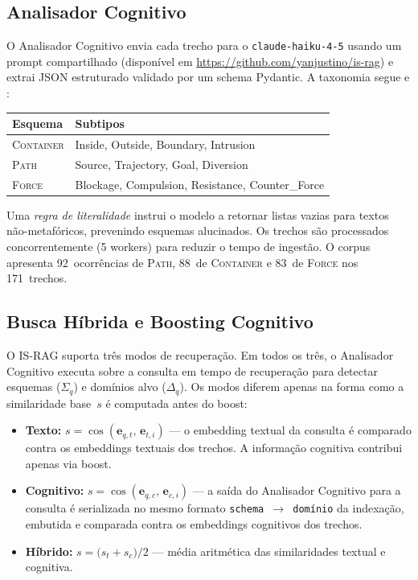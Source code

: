 \documentclass[11pt,a4paper]{article}
\begin{document}
\subsection{Analisador Cognitivo}

O Analisador Cognitivo envia cada trecho para o
\texttt{claude-haiku-4-5} \citep{anthropic2024} usando um prompt
compartilhado (disponível em \url{https://github.com/yanjustino/is-rag}) e extrai JSON estruturado
validado por um schema Pydantic.
A taxonomia segue \citet{lakoff1980} e \citet{talmy1988}:

\begin{center}
\small
\begin{tabular}{ll}
\toprule
\textbf{Esquema} & \textbf{Subtipos} \\
\midrule
\textsc{Container} & Inside, Outside, Boundary, Intrusion \\
\textsc{Path}      & Source, Trajectory, Goal, Diversion \\
\textsc{Force}     & Blockage, Compulsion, Resistance, Counter\_Force \\
\bottomrule
\end{tabular}
\end{center}

Uma \emph{regra de literalidade} instrui o modelo a retornar listas
vazias para textos não-metafóricos, prevenindo esquemas alucinados.
Os trechos são processados concorrentemente (5 workers) para reduzir
o tempo de ingestão.
O corpus apresenta 92~ocorrências de \textsc{Path}, 88~de
\textsc{Container} e 83~de \textsc{Force} nos 171~trechos.

\subsection{Busca Híbrida e Boosting Cognitivo}
\label{sec:boosting}

O IS-RAG suporta três modos de recuperação.
Em todos os três, o Analisador Cognitivo executa sobre a consulta em
tempo de recuperação para detectar esquemas ($\Sigma_q$) e domínios
alvo ($\Delta_q$).
Os modos diferem apenas na forma como a similaridade base~$s$ é
computada antes do boost:

\begin{itemize}[noitemsep,topsep=2pt]
  \item \textbf{Texto:} $s = \cos(\mathbf{e}_{q,t},\,\mathbf{e}_{t,i})$
        — o embedding textual da consulta é comparado contra os
        embeddings textuais dos trechos.
        A informação cognitiva contribui apenas via boost.
  \item \textbf{Cognitivo:} $s = \cos(\mathbf{e}_{q,c},\,\mathbf{e}_{c,i})$
        — a saída do Analisador Cognitivo para a consulta é serializada
        no mesmo formato \texttt{schema\,$\to$\,domínio} da indexação,
        embutida e comparada contra os embeddings cognitivos dos trechos.
  \item \textbf{Híbrido:} $s = \bigl(s_t + s_c\bigr)/2$
        — média aritmética das similaridades textual e cognitiva.
\end{itemize}
\end{document}
